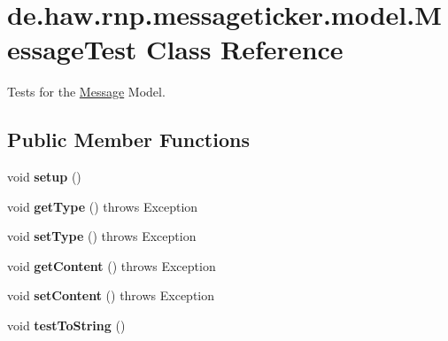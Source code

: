 \hypertarget{classde_1_1haw_1_1rnp_1_1messageticker_1_1model_1_1MessageTest}{\section{de.\-haw.\-rnp.\-messageticker.\-model.\-Message\-Test Class Reference}
\label{classde_1_1haw_1_1rnp_1_1messageticker_1_1model_1_1MessageTest}
}


Tests for the \hyperlink{classde_1_1haw_1_1rnp_1_1messageticker_1_1model_1_1Message}{Message} Model.  


\subsection*{Public Member Functions}
\begin{DoxyCompactItemize}
\item 
\hypertarget{classde_1_1haw_1_1rnp_1_1messageticker_1_1model_1_1MessageTest_afbfebc1651b9d9424418bd99a3813ed7}{void {\bfseries setup} ()}\label{classde_1_1haw_1_1rnp_1_1messageticker_1_1model_1_1MessageTest_afbfebc1651b9d9424418bd99a3813ed7}

\item 
\hypertarget{classde_1_1haw_1_1rnp_1_1messageticker_1_1model_1_1MessageTest_a80a0215d5c382d4a57eace0460e211a3}{void {\bfseries get\-Type} ()  throws Exception }\label{classde_1_1haw_1_1rnp_1_1messageticker_1_1model_1_1MessageTest_a80a0215d5c382d4a57eace0460e211a3}

\item 
\hypertarget{classde_1_1haw_1_1rnp_1_1messageticker_1_1model_1_1MessageTest_aad9efd82225ac06bba689cd3c278cb00}{void {\bfseries set\-Type} ()  throws Exception }\label{classde_1_1haw_1_1rnp_1_1messageticker_1_1model_1_1MessageTest_aad9efd82225ac06bba689cd3c278cb00}

\item 
\hypertarget{classde_1_1haw_1_1rnp_1_1messageticker_1_1model_1_1MessageTest_aa11eb10c39f456c34905d442ee6bf0fc}{void {\bfseries get\-Content} ()  throws Exception }\label{classde_1_1haw_1_1rnp_1_1messageticker_1_1model_1_1MessageTest_aa11eb10c39f456c34905d442ee6bf0fc}

\item 
\hypertarget{classde_1_1haw_1_1rnp_1_1messageticker_1_1model_1_1MessageTest_ab6daed916113c20b3d4409a4fcba5779}{void {\bfseries set\-Content} ()  throws Exception }\label{classde_1_1haw_1_1rnp_1_1messageticker_1_1model_1_1MessageTest_ab6daed916113c20b3d4409a4fcba5779}

\item 
\hypertarget{classde_1_1haw_1_1rnp_1_1messageticker_1_1model_1_1MessageTest_a6bf4adea40ed3636568b765d8c573a0c}{void {\bfseries test\-To\-String} ()}\label{classde_1_1haw_1_1rnp_1_1messageticker_1_1model_1_1MessageTest_a6bf4adea40ed3636568b765d8c573a0c}

\end{DoxyCompactItemize}


